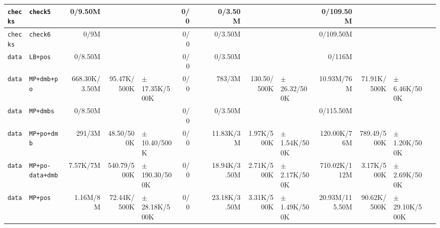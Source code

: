 \begin{tabular}{l l  | r r l | r r l | r r l | r r l l}
         \verb|checks| &                                               \verb|check5| &        0/9.50M &                       &                   &            0/0 &                       &  &        0/3.50M &                       &                   &      0/109.50M &                       &                    & \\ \hline 
         \verb|checks| &                                               \verb|check6| &           0/9M &                       &                   &            0/0 &                       &  &        0/3.50M &                       &                   &      0/109.50M &                       &                    & \\ \hline 
           \verb|data| &                                               \verb|LB+pos| &        0/8.50M &                       &                   &            0/0 &                       &  &        0/3.50M &                       &                   &         0/116M &                       &                    & \\ \hline 
           \verb|data| &                                            \verb|MP+dmb+po| &  668.30K/3.50M &           95.47K/500K & $\pm$ 17.35K/500K &            0/0 &                       &  &         783/3M &           130.50/500K &  $\pm$ 26.32/500K &     10.93M/76M &           71.91K/500K &   $\pm$ 6.46K/500K & \\ \hline 
           \verb|data| &                                              \verb|MP+dmbs| &        0/8.50M &                       &                   &            0/0 &                       &  &        0/3.50M &                       &                   &      0/115.50M &                       &                    & \\ \hline 
           \verb|data| &                                            \verb|MP+po+dmb| &         291/3M &            48.50/500K &  $\pm$ 10.40/500K &            0/0 &                       &  &      11.83K/3M &            1.97K/500K &  $\pm$ 1.54K/500K &    120.00K/76M &           789.49/500K &   $\pm$ 1.20K/500K & \\ \hline 
           \verb|data| &                                       \verb|MP+po-data+dmb| &       7.57K/7M &           540.79/500K & $\pm$ 190.30/500K &            0/0 &                       &  &   18.94K/3.50M &            2.71K/500K &  $\pm$ 2.17K/500K &   710.02K/112M &            3.17K/500K &   $\pm$ 2.69K/500K & \\ \hline 
           \verb|data| &                                               \verb|MP+pos| &       1.16M/8M &           72.44K/500K & $\pm$ 28.18K/500K &            0/0 &                       &  &   23.18K/3.50M &            3.31K/500K &  $\pm$ 1.49K/500K & 20.93M/115.50M &           90.62K/500K &  $\pm$ 29.10K/500K & \\ \hline 

\end{tabular}
